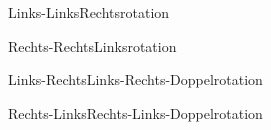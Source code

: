 \begin{frame}{Links-Links}{Rechtsrotation}
\end{frame}

\begin{frame}{Rechts-Rechts}{Linksrotation}
\end{frame}

\begin{frame}{Links-Rechts}{Links-Rechts-Doppelrotation}
\end{frame}

\begin{frame}{Rechts-Links}{Rechts-Links-Doppelrotation}
\end{frame}